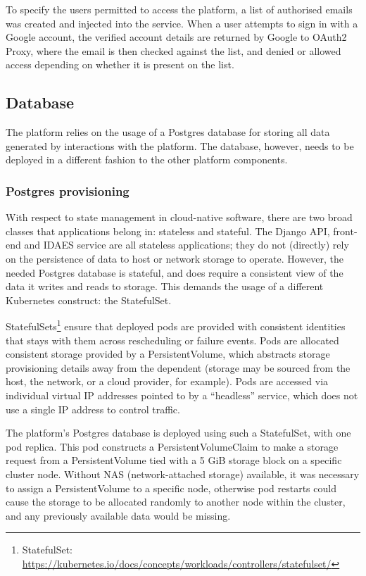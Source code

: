 
To specify the users permitted to access the platform, a list of authorised emails was created and injected into the service. When a user attempts to sign in with a Google account, the verified account details are returned by Google to OAuth2 Proxy, where the email is then checked against the list, and denied or allowed access depending on whether it is present on the list.

\subsection{Database}

The platform relies on the usage of a Postgres database for storing all data generated by interactions with the platform. The database, however, needs to be deployed in a different fashion to the other platform components. 

\subsubsection{Postgres provisioning}

With respect to state management in cloud-native software, there are two broad classes that applications belong in: stateless and stateful. The Django API, front-end and IDAES service are all stateless applications; they do not (directly) rely on the persistence of data to host or network storage to operate. However, the needed Postgres database is stateful, and does require a consistent view of the data it writes and reads to storage. This demands the usage of a different Kubernetes construct: the StatefulSet.

StatefulSets\footnote{StatefulSet: \url{https://kubernetes.io/docs/concepts/workloads/controllers/statefulset/}} ensure that deployed pods are provided with consistent identities that stays with them across rescheduling or failure events. Pods are allocated consistent storage provided by a PersistentVolume, which abstracts storage provisioning details away from the dependent (storage may be sourced from the host, the network, or a cloud provider, for example). Pods are accessed via individual virtual IP addresses pointed to by a ``headless'' service, which does not use a single IP address to control traffic.

The platform's Postgres database is deployed using such a StatefulSet, with one pod replica. This pod constructs a PersistentVolumeClaim to make a storage request from a PersistentVolume tied with a 5 GiB storage block on a specific cluster node. Without NAS (network-attached storage) available, it was necessary to assign a PersistentVolume to a specific node, otherwise pod restarts could cause the storage to be allocated randomly to another node within the cluster, and any previously available data would be missing.

